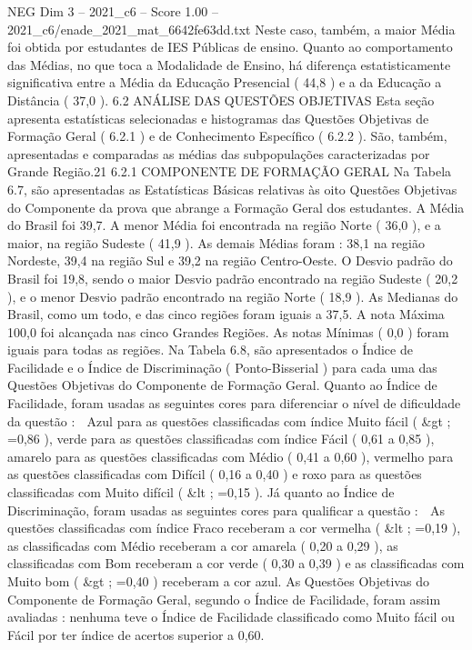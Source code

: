 \begin{textsample}{NEG Dim 3 – 2021\_c6 – Score 1.00 – 2021\_c6/enade\_2021\_mat\_6642fe63dd.txt}
Neste caso, também, a maior Média foi obtida por estudantes de IES Públicas de ensino.
Quanto ao comportamento das Médias, no que toca a Modalidade de Ensino, há diferença estatisticamente significativa entre a Média da Educação Presencial ( 44,8 ) e a da Educação a Distância ( 37,0 ). 6.2 ANÁLISE DAS QUESTÕES OBJETIVAS Esta seção apresenta estatísticas selecionadas e histogramas das Questões Objetivas de Formação Geral ( 6.2.1 ) e de Conhecimento Específico ( 6.2.2 ).
São, também, apresentadas e comparadas as médias das subpopulações caracterizadas por Grande Região.21 6.2.1 COMPONENTE DE FORMAÇÃO GERAL Na Tabela 6.7, são apresentadas as Estatísticas Básicas relativas às oito Questões Objetivas do Componente da prova que abrange a Formação Geral dos estudantes.
A Média do Brasil foi 39,7.
A menor Média foi encontrada na região Norte ( 36,0 ), e a maior, na região Sudeste ( 41,9 ).
As demais Médias foram : 38,1 na região Nordeste, 39,4 na região Sul e 39,2 na região Centro-Oeste.
O Desvio padrão do Brasil foi 19,8, sendo o maior Desvio padrão encontrado na região Sudeste ( 20,2 ), e o menor Desvio padrão encontrado na região Norte ( 18,9 ).
As Medianas do Brasil, como um todo, e das cinco regiões foram iguais a 37,5.
A nota Máxima 100,0 foi alcançada nas cinco Grandes Regiões.
As notas Mínimas ( 0,0 ) foram iguais para todas as regiões.
Na Tabela 6.8, são apresentados o Índice de Facilidade e o Índice de Discriminação ( Ponto-Bisserial ) para cada uma das Questões Objetivas do Componente de Formação Geral.
Quanto ao Índice de Facilidade, foram usadas as seguintes cores para diferenciar o nível de dificuldade da questão :  Azul para as questões classificadas com índice Muito fácil ( \&gt ; =0,86 ), verde para as questões classificadas com índice Fácil ( 0,61 a 0,85 ), amarelo para as questões classificadas com Médio ( 0,41 a 0,60 ), vermelho para as questões classificadas com Difícil ( 0,16 a 0,40 ) e roxo para as questões classificadas com Muito difícil ( \&lt ; =0,15 ).
Já quanto ao Índice de Discriminação, foram usadas as seguintes cores para qualificar a questão :  As questões classificadas com índice Fraco receberam a cor vermelha ( \&lt ; =0,19 ), as classificadas com Médio receberam a cor amarela ( 0,20 a 0,29 ), as classificadas com Bom receberam a cor verde ( 0,30 a 0,39 ) e as classificadas com Muito bom ( \&gt ; =0,40 ) receberam a cor azul.
As Questões Objetivas do Componente de Formação Geral, segundo o Índice de Facilidade, foram assim avaliadas : nenhuma teve o Índice de Facilidade classificado como Muito fácil ou Fácil por ter índice de acertos superior a 0,60.

\end{textsample}
